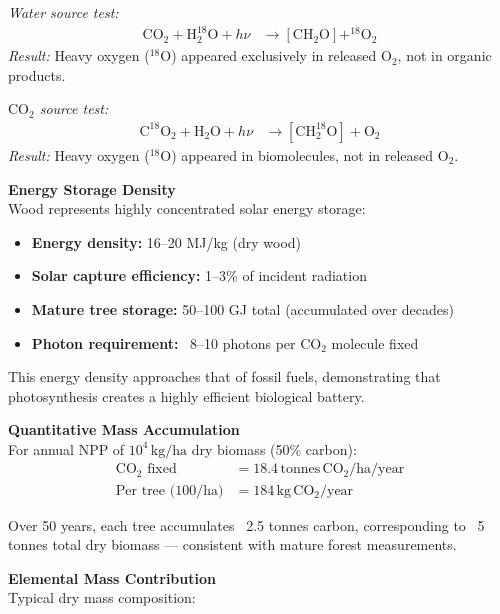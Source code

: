 \begin{technical}
\noindent\textit{Water source test:}
\begin{align}
\mathrm{CO}_2 + \mathrm{H}_2^{18}\mathrm{O} + h\nu 
&\rightarrow [\mathrm{CH}_2\mathrm{O}] + ^{18}\mathrm{O}_2
\end{align}
\textit{Result:} Heavy oxygen ($^{18}\mathrm{O}$) appeared exclusively in released $\mathrm{O}_2$, not in organic products.

\noindent\textit{$\mathrm{CO}_2$ source test:}
\begin{align}
\mathrm{C}^{18}\mathrm{O}_2 + \mathrm{H}_2\mathrm{O} + h\nu 
&\rightarrow [\mathrm{CH}_2^{18}\mathrm{O}] + \mathrm{O}_2
\end{align}
\textit{Result:} Heavy oxygen ($^{18}\mathrm{O}$) appeared in biomolecules, not in released $\mathrm{O}_2$.

\noindent\textbf{Energy Storage Density}\\[0.5em]
Wood represents highly concentrated solar energy storage:

\begin{itemize}[leftmargin=*]
  \item \textbf{Energy density:} 16–20 MJ/kg (dry wood)
  \item \textbf{Solar capture efficiency:} 1–3\% of incident radiation
  \item \textbf{Mature tree storage:} 50–100 GJ total (accumulated over decades)
  \item \textbf{Photon requirement:} ~8–10 photons per $\mathrm{CO}_2$ molecule fixed
\end{itemize}

This energy density approaches that of fossil fuels, demonstrating that photosynthesis creates a highly efficient biological battery.

\noindent\textbf{Quantitative Mass Accumulation}\\[0.5em]
For annual NPP of $10^4\,\mathrm{kg/ha}$ dry biomass (50\% carbon):
\begin{align}
\text{$\mathrm{CO}_2$ fixed} &= 18.4\,\mathrm{tonnes}\,\mathrm{CO}_2/\mathrm{ha}/\mathrm{year} \\
\text{Per tree (100/ha)} &= 184\,\mathrm{kg}\,\mathrm{CO}_2/\mathrm{year}
\end{align}

Over 50 years, each tree accumulates ~2.5 tonnes carbon, corresponding to ~5 tonnes total dry biomass — consistent with mature forest measurements.

\noindent\textbf{Elemental Mass Contribution}\\[0.5em]
Typical dry mass composition:


\end{technical}
